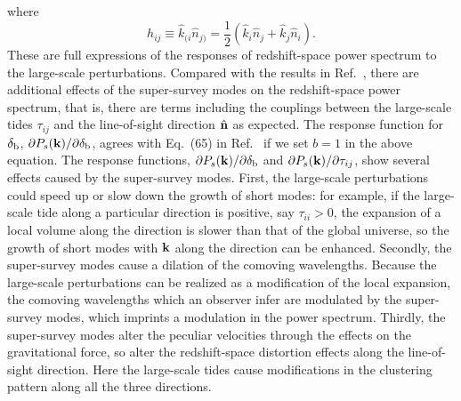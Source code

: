 \documentclass[prd,onecolumn,notitlepage,amsmath,amssymb,floatfix,superscriptaddress]{revtex4-1}
\newcommand{\bk}{{\bf k}}
\newcommand{\bn}{{\bf n}}
\newcommand{\hk}{\hat{k}}
\newcommand{\hn}{\hat{n}}
\newcommand{\br}{{\rm b}}
\begin{document}
%
where 
%
\begin{equation}
h_{ij}\equiv \hk_{(i} \hn_{j)}
= \frac{1}{2}
\left(\hk_i\hn_j+\hk_j\hn_i\right).
\end{equation}
%
These are full expressions of the responses of redshift-space power spectrum to the large-scale perturbations. Compared with 
the results in Ref.~\cite{Akitsuetal:17}, there are additional effects of the super-survey modes on 
the redshift-space power spectrum, that is,
there are terms including the couplings between the large-scale tides $\tau_{ij}$ and the line-of-sight direction $\hat{\bn}$ 
as expected.
The response function for $\delta_\br$, $\partial P_s(\bk)/\partial \delta_\br$, agrees with Eq.~(65)
in Ref.~\cite{NishimichiValageas:15} if we set $b=1$ in the above equation. 
The response functions, $\partial P_s(\bk)/\partial \delta_{\rm b}$ and $\partial P_s(\bk)/\partial \tau_{ij}$, 
show several effects caused by the super-survey modes.
First, the large-scale perturbations could speed up or slow down the growth of short modes:
for example, if the large-scale tide along a particular direction is positive, 
say $\tau_{ii}>0$, the expansion of a local volume along the direction is slower than that of the global universe, 
so the growth of short modes with $\bk$ along the direction can be enhanced. Secondly, the super-survey modes cause
a dilation of the comoving wavelengths. Because the large-scale perturbations can be realized as a modification of the local 
expansion, the comoving wavelengths which an observer infer are modulated by the super-survey modes, which
imprints a modulation in the power spectrum.
Thirdly, the super-survey modes alter
the peculiar velocities through the effects on the gravitational force, so alter the redshift-space distortion effects along 
the line-of-sight direction. 
Here the large-scale tides cause modifications in the clustering pattern along all the three directions. 
\end{document}
